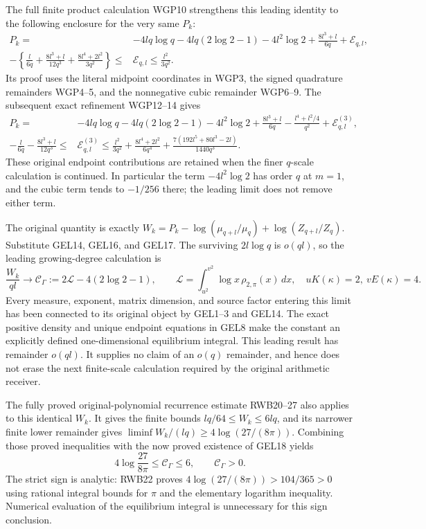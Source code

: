 The full finite product calculation WGP10 strengthens this leading
identity to the following enclosure for the very same \(P_k\):
\[
 \begin{split}
 P_k={}&-4lq\log q-4lq(2\log2-1)-4l^2\log2
              +\frac{8l^3+l}{6q}+\mathcal E_{q,l},\\
 -\left\{\frac l{6q}+\frac{8l^3+l}{12q^3}
                 +\frac{8l^4+2l^2}{3q^2}\right\}
 \leq{}&\mathcal E_{q,l}\leq\frac{l^2}{3q^2}.
 \end{split}
 \tag{GEL17a}
\]
Its proof uses the literal midpoint coordinates in WGP3, the signed
quadrature remainders WGP4--5, and the nonnegative cubic remainder
WGP6--9. The subsequent exact refinement WGP12--14 gives
\[
 \begin{split}
 P_k={}&-4lq\log q-4lq(2\log2-1)-4l^2\log2
 +\frac{8l^3+l}{6q}-\frac{l^4+l^2/4}{q^2}
          +\mathcal E^{(3)}_{q,l},\\
 -\frac l{6q}-\frac{8l^3+l}{12q^3}
 \leq{}&\mathcal E^{(3)}_{q,l}\leq
 \frac{l^2}{3q^2}+\frac{8l^4+2l^2}{6q^4}
                 +\frac{7(192l^5+80l^3-2l)}{1440q^3}.
 \end{split}
 \tag{GEL17b}
\]
These original endpoint contributions are retained when the finer
\(q\)-scale calculation is continued. In particular the term
\(-4l^2\log2\) has order \(q\) at \(m=1\), and the cubic term tends
to \(-1/256\) there; the leading limit does not remove either term.

The original quantity is exactly
\(W_k=P_k-\log(\mu_{q+l}/\mu_q)+\log(Z_{q+l}/Z_q)\).
Substitute GEL14, GEL16, and GEL17. The surviving
\(2l\log q\) is \(o(ql)\), so the leading growing-degree calculation is
\[
 \boxed{\frac{W_k}{ql}\longrightarrow
 \mathcal C_\Gamma:=2\mathcal L-4(2\log2-1),\qquad
 \mathcal L=\int_{u^2}^{v^2}\log x\,\rho_{2,\pi}(x)\,dx,\quad
 uK(\kappa)=2,\ vE(\kappa)=4.}
 \tag{GEL18}
\]
Every measure, exponent, matrix dimension, and source factor entering this
limit has been connected to its original object by GEL1--3 and GEL14.
The exact positive density and unique endpoint equations in GEL8 make
the constant an explicitly defined one-dimensional equilibrium integral.
This leading result has remainder \(o(ql)\). It supplies no claim of
an \(o(q)\) remainder, and hence does not erase the next finite-scale
calculation required by the original arithmetic receiver.

The fully proved original-polynomial recurrence estimate RWB20--27
also applies to this identical \(W_k\). It gives the finite bounds
\(lq/64\leq W_k\leq6lq\), and its narrower finite lower remainder
gives \(\liminf W_k/(lq)\geq4\log(27/(8\pi))\). Combining those
proved inequalities with the now proved existence of GEL18 yields
\[
 \boxed{4\log\frac{27}{8\pi}\leq\mathcal C_\Gamma\leq6,
              \qquad\mathcal C_\Gamma>0.}
 \tag{GEL18a}
\]
The strict sign is analytic: RWB22 proves
\(4\log(27/(8\pi))>104/365>0\) using rational integral bounds for
\(\pi\) and the elementary logarithm inequality. Numerical evaluation
of the equilibrium integral is unnecessary for this sign conclusion.

